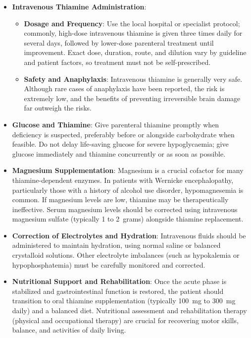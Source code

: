 \begin{itemize}
    \item \textbf{Intravenous Thiamine Administration}:
    \begin{itemize}
        \item \textbf{Dosage and Frequency}: Use the local hospital or specialist protocol; commonly, high-dose intravenous thiamine is given three times daily for several days, followed by lower-dose parenteral treatment until improvement. Exact dose, duration, route, and dilution vary by guideline and patient factors, so treatment must not be self-prescribed.
        \item \textbf{Safety and Anaphylaxis}: Intravenous thiamine is generally very safe. Although rare cases of anaphylaxis have been reported, the risk is extremely low, and the benefits of preventing irreversible brain damage far outweigh the risks.
    \end{itemize}
    \item \textbf{Glucose and Thiamine}: Give parenteral thiamine promptly when deficiency is suspected, preferably before or alongside carbohydrate when feasible. Do not delay life-saving glucose for severe hypoglycaemia; give glucose immediately and thiamine concurrently or as soon as possible.
    \item \textbf{Magnesium Supplementation}: Magnesium is a crucial cofactor for many thiamine-dependent enzymes. In patients with Wernicke encephalopathy, particularly those with a history of alcohol use disorder, hypomagnesemia is common. If magnesium levels are low, thiamine may be therapeutically ineffective. Serum magnesium levels should be corrected using intravenous magnesium sulfate (typically 1 to 2~grams) alongside thiamine replacement.
    \item \textbf{Correction of Electrolytes and Hydration}: Intravenous fluids should be administered to maintain hydration, using normal saline or balanced crystalloid solutions. Other electrolyte imbalances (such as hypokalemia or hypophosphatemia) must be carefully monitored and corrected.
    \item \textbf{Nutritional Support and Rehabilitation}: Once the acute phase is stabilized and gastrointestinal function is restored, the patient should transition to oral thiamine supplementation (typically 100~mg to 300~mg daily) and a balanced diet. Nutritional assessment and rehabilitation therapy (physical and occupational therapy) are crucial for recovering motor skills, balance, and activities of daily living.
\end{itemize}

